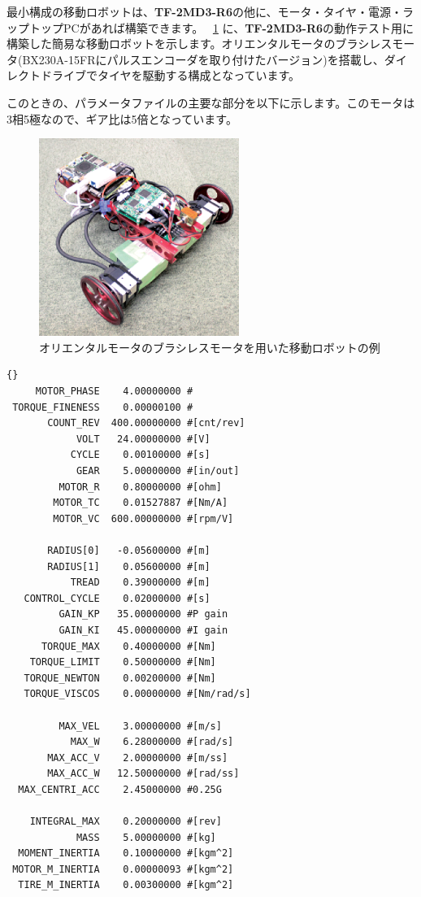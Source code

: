 \documentclass[11pt,a4j,openany]{jbook}
\begin{document}
最小構成の移動ロボットは、{\bf TF-2MD3-R6}の他に、モータ・タイヤ・電源・ラップトップPCがあれば構築できます。
\figurename~\ref{fig:simple_robot} に、{\bf TF-2MD3-R6}の動作テスト用に構築した簡易な移動ロボットを示します。オリエンタルモータのブラシレスモータ(BX230A-15FRにパルスエンコーダを取り付けたバージョン)を搭載し、ダイレクトドライブでタイヤを駆動する構成となっています。\par
このときの、パラメータファイルの主要な部分を以下に示します。このモータは3相5極なので、ギア比は5倍となっています。\par
\begin{figure}[H]
\centering\includegraphics[width=65mm]{simple_robot.eps}
\caption{オリエンタルモータのブラシレスモータを用いた移動ロボットの例}
\label{fig:simple_robot}
\end{figure}


\begin{lstlisting}{}
     MOTOR_PHASE    4.00000000 #
 TORQUE_FINENESS    0.00000100 #
       COUNT_REV  400.00000000 #[cnt/rev]
            VOLT   24.00000000 #[V]
           CYCLE    0.00100000 #[s]
            GEAR    5.00000000 #[in/out]
         MOTOR_R    0.80000000 #[ohm]
        MOTOR_TC    0.01527887 #[Nm/A]
        MOTOR_VC  600.00000000 #[rpm/V]

       RADIUS[0]   -0.05600000 #[m]
       RADIUS[1]    0.05600000 #[m]
           TREAD    0.39000000 #[m]
   CONTROL_CYCLE    0.02000000 #[s]
         GAIN_KP   35.00000000 #P gain
         GAIN_KI   45.00000000 #I gain
      TORQUE_MAX    0.40000000 #[Nm]
    TORQUE_LIMIT    0.50000000 #[Nm]
   TORQUE_NEWTON    0.00200000 #[Nm]
   TORQUE_VISCOS    0.00000000 #[Nm/rad/s]

         MAX_VEL    3.00000000 #[m/s]
           MAX_W    6.28000000 #[rad/s]
       MAX_ACC_V    2.00000000 #[m/ss]
       MAX_ACC_W   12.50000000 #[rad/ss]
  MAX_CENTRI_ACC    2.45000000 #0.25G

    INTEGRAL_MAX    0.20000000 #[rev]
            MASS    5.00000000 #[kg]
  MOMENT_INERTIA    0.10000000 #[kgm^2]
 MOTOR_M_INERTIA    0.00000093 #[kgm^2]
  TIRE_M_INERTIA    0.00300000 #[kgm^2]
\end{lstlisting}
\end{document}
